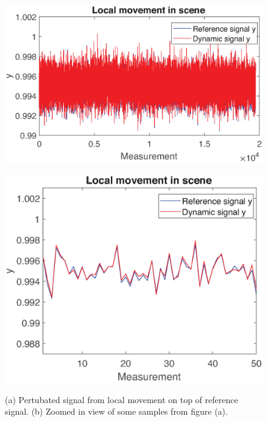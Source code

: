 \begin{figure}[H]
    \centering
\begin{minipage}[t]{0.53\textwidth}
    \includegraphics[width=1\textwidth]{result/dynamic/local/local_whole_time1.eps}
    \subcaption{}
    \label{fig:local_sig_1}
\end{minipage}
\begin{minipage}[t]{0.46\textwidth}
    \includegraphics[width = \textwidth]{result/dynamic/local/local_whole_time_win1.eps}
    \subcaption{}
    \label{fig:local_sig_2}
\end{minipage}
    \caption{(a) Pertubated signal from local movement on top of reference signal. (b) Zoomed in view of some samples from figure (a).}
    \label{fig:local_sig}
\end{figure}


